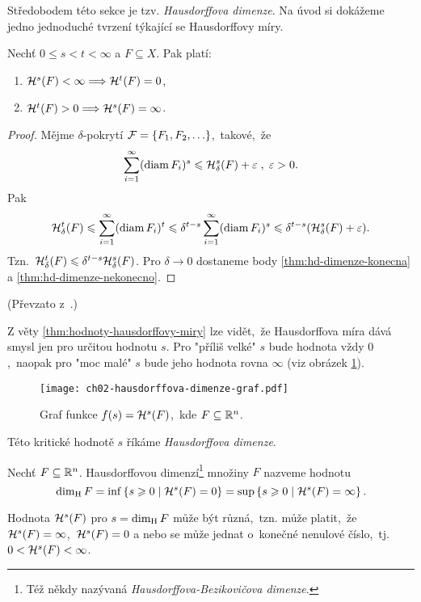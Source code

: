 Středobodem této sekce je tzv. \emph{Hausdorffova dimenze}. Na úvod si dokážeme jedno jednoduché tvrzení týkající se Hausdorffovy míry.
\begin{theorem}\label{thm:hodnoty-hausdorffovy-miry}
    Nechť $0\leqslant s<t<\infty$ a $F\subseteq X$. Pak platí:
    \begin{enumerate}[label=(\roman*)]
        \item\label{thm:hd-dimenze-konecna} $\mathcal{H}^{s}(F)<\infty\Longrightarrow\mathcal{H}^{t}(F)=0$,
        \item\label{thm:hd-dimenze-nekonecno} $\mathcal{H}^{t}(F)>0\Longrightarrow\mathcal{H}^{s}(F)=\infty$.
    \end{enumerate}
\end{theorem}
\begin{proof}
    Mějme $\delta$-pokrytí $\mathcal{F}=\left\{F_1,F_2,\ldots\right\}$,~takové,~že
    \[\sum_{i=1}^{\infty}(\operatorname{diam}{F_i})^s\leqslant\mathcal{H}_{\delta}^{s}(F)+\varepsilon\;,\;\varepsilon>0.\]
    Pak
    \[\mathcal{H}_{\delta}^{t}(F)\leqslant\sum_{i=1}^{\infty}(\operatorname{diam}{F_i})^t\leqslant\delta^{t-s}\sum_{i=1}^{\infty}(\operatorname{diam}{F_i})^s\leqslant\delta^{t-s}(\mathcal{H}_{\delta}^{s}(F)+\varepsilon).\]
    Tzn.~$\mathcal{H}_{\delta}^{t}(F)\leqslant\delta^{t-s}\mathcal{H}_{\delta}^{s}(F)$. Pro $\delta\to 0$ dostaneme body \ref{thm:hd-dimenze-konecna} a \ref{thm:hd-dimenze-nekonecno}.
\end{proof}
(Převzato z~\citep[str. 68]{Mattila1995}.)

Z věty \ref{thm:hodnoty-hausdorffovy-miry} lze vidět,~že Hausdorffova míra dává smysl jen pro určitou hodnotu $s$. Pro "příliš velké" $s$ bude hodnota vždy $0$,~naopak pro "moc malé" $s$ bude jeho hodnota rovna $\infty$ (viz obrázek \ref{fig:hausdorffova-dimenze-graf}).
\begin{figure}[h]
    \centering
    \texttt{[image: ch02-hausdorffova-dimenze-graf.pdf]}
    \caption{Graf funkce $f(s)=\mathcal{H}^{s}(F)$,~kde $F\subseteq\mathbb{R}^n$.}
    \label{fig:hausdorffova-dimenze-graf}
\end{figure}
Této kritické hodnotě $s$ říkáme \emph{Hausdorffova dimenze}.
\begin{definition}\label{def:hausdorffova-dimenze}
    Nechť $F\subseteq\mathbb{R}^n$. Hausdorffovou dimenzí\footnote{Též někdy nazývaná \emph{Hausdorffova-Bezikovičova dimenze}. } množiny $F$ nazveme hodnotu
    \[\operatorname{dim_H}{F}=\inf\left\{s\geqslant 0\mid\mathcal{H}^{s}(F)=0\right\}=\sup\left\{s\geqslant 0\mid\mathcal{H}^{s}(F)=\infty\right\}.\]
\end{definition}
Hodnota $\mathcal{H}^{s}(F)$ pro $s=\operatorname{dim_H}{F}$ může být různá,~tzn. může platit,~že $\mathcal{H}^{s}(F)=\infty$,~$\mathcal{H}^{s}(F)=0$ a nebo se může jednat o~konečné nenulové číslo,~tj. $0<\mathcal{H}^{s}(F)<\infty$.